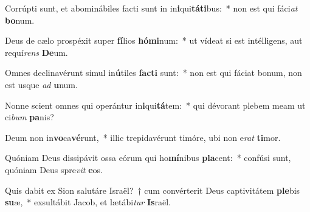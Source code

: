 \item Corrúpti sunt, et abominábiles facti sunt in in\textbf{i}qui\textbf{tá}\textbf{ti}bus:~* non est qui fáci\textit{at} \textbf{bo}num.
\item Deus de cælo prospéxit super \textbf{fí}lios \textbf{hó}\textbf{mi}num:~* ut vídeat si est intélligens, aut requí\textit{rens} \textbf{De}um.
\item Omnes declinavérunt simul in\textbf{ú}tiles \textbf{fac}\textbf{ti} sunt:~* non est qui fáciat bonum, non est usque \textit{ad} \textbf{u}num.
\item Nonne scient omnes qui operántur in\textbf{i}qui\textbf{tá}tem:~* qui dévorant plebem meam ut ci\textit{bum} \textbf{pa}nis?
\item Deum non in\textbf{vo}ca\textbf{vé}runt,~* illic trepidavérunt timóre, ubi non e\textit{rat} \textbf{ti}mor.
\item Quóniam Deus dissipávit ossa eórum qui ho\textbf{mí}nibus \textbf{pla}cent:~* confúsi sunt, quóniam Deus spre\textit{vit} \textbf{e}os.
\item Quis dabit ex Sion salutáre Israël?~† cum convérterit Deus captivitátem \textbf{ple}bis \textbf{su}æ,~* exsultábit Jacob, et lætábi\textit{tur} \textbf{Is}raël.
